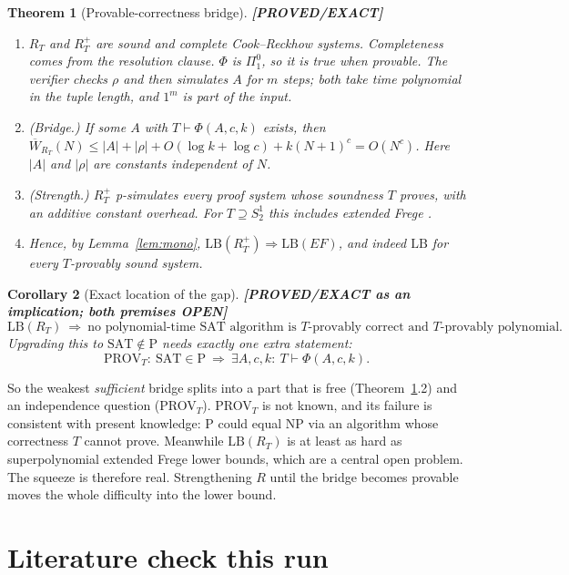 \documentclass[11pt]{article}
\newtheorem{theorem}{Theorem}
\newtheorem{corollary}[theorem]{Corollary}
\theoremstyle{definition}
\theoremstyle{remark}
\newcommand{\SAT}{\mathrm{SAT}}
\newcommand{\Wb}{\overline W}
\newcommand{\status}[1]{\textbf{[#1]}}
\begin{document}
\begin{theorem}[Provable-correctness bridge]\label{thm:refl}
\status{PROVED/EXACT}
\begin{enumerate}
\item $R_T$ and $R_T^{+}$ are sound and complete Cook--Reckhow systems. Completeness comes from the resolution clause. $\Phi$ is
$\Pi^0_1$, so it is true when provable. The verifier checks $\rho$ and then
simulates $A$ for $m$ steps; both take time polynomial in the tuple length,
and $1^m$ is part of the input.
\item \emph{(Bridge.)} If some $A$ with $T\vdash\Phi(A,c,k)$ exists, then
$\Wb_{R_T}(N)\le |A|+|\rho|+O(\log k+\log c)+k(N+1)^c=O(N^c)$. Here
$|A|$ and $|\rho|$ are constants independent of $N$.
\item \emph{(Strength.)} $R_T^{+}$ p-simulates every proof system whose
soundness $T$ proves, with an additive constant overhead. For
$T\supseteq S^1_2$ this includes extended Frege \cite{cook1975,krajicekpudlak1989}.
\item Hence, by Lemma~\ref{lem:mono}, $\mathrm{LB}(R_T^{+})\Rightarrow\mathrm{LB}(EF)$,
and indeed $\mathrm{LB}$ for every $T$-provably sound system.
\end{enumerate}
\end{theorem}

\begin{corollary}[Exact location of the gap]\label{cor:gap}
\status{PROVED/EXACT as an implication; both premises OPEN}
\[
 \mathrm{LB}(R_T)\ \Longrightarrow\ \text{no polynomial-time SAT algorithm is $T$-provably correct and $T$-provably polynomial.}
\]
Upgrading this to $\SAT\notin\mathrm P$ needs exactly one extra statement:
\[
 \mathrm{PROV}_T:\ \SAT\in\mathrm P\ \Longrightarrow\ \exists A,c,k:\ T\vdash\Phi(A,c,k).
\]
\end{corollary}

So the weakest \emph{sufficient} bridge splits into a part that is free
(Theorem~\ref{thm:refl}.2) and an independence question (PROV$_T$). PROV$_T$ is
not known, and its failure is consistent with present knowledge: P could equal
NP via an algorithm whose correctness $T$ cannot prove. Meanwhile
$\mathrm{LB}(R_T)$ is at least as hard as superpolynomial extended Frege lower
bounds, which are a central open problem. The squeeze is therefore real.
Strengthening $R$ until the bridge becomes provable moves the whole
difficulty into the lower bound.

\section{Literature check this run}
\end{document}
